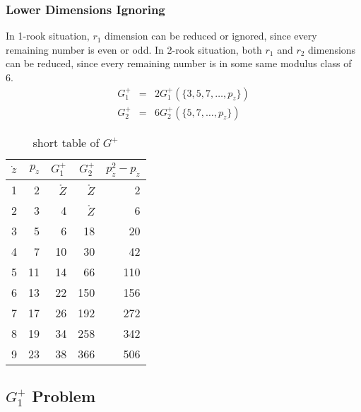 \documentclass[twocolumn]{article}%
\theoremstyle{definition}
\theoremstyle{remark}
\begin{document}
\subsubsection*{Lower Dimensions Ignoring}
In 1-rook situation, $r_1$ dimension can be reduced or ignored, since every remaining number is even or odd.
In 2-rook situation, both $r_1$ and $r_2$ dimensions can be reduced, since every remaining number is in some same modulus class of 6.
\begin{eqnarray*}
	G_1^{+}&=&2 G_1^{+}(\{3,5,7,\dots,p_{\dot{z}}\})\\
	G_2^{+}&=&6 G_2^{+}(\{  5,7,\dots,p_{\dot{z}}\})
\end{eqnarray*}
\begin{table}
	\centering	
	\begin{tabular}{lrrrr}
\toprule
$\dot{z}$	&$p_{\dot{z}}$	&$G_1^{+}$ &$G_2^{+}$	&$p_{\dot{z}}^2-p_{\dot{z}}$\\
\midrule
1	&2	&$\mathring{Z}$&$\mathring{Z}$	&2\\
2	&3	&4		&$\mathring{Z}$	&6\\
3	&5	&6 	&18	&20\\
4	&7	&10 	&30	&42\\
5	&11	&14 	&66	&110\\
6 	&13	&22 	&150	&156\\
7	&17	&26 	&192	&272\\
8	&19	&34 	&258	&342\\
9	&23	&38 	&366	&506\\
\bottomrule
	\end{tabular}
	\caption{short table of $G^{+}$}
\end{table}
\subsection*{$G_1^{+}$ Problem}
\end{document}
